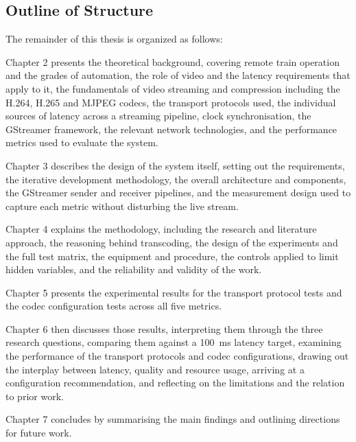 \subsection{Outline of Structure}

The remainder of this thesis is organized as follows:

Chapter 2 presents the theoretical background, covering remote train operation and the grades of automation, the role of video and the latency requirements that apply to it, the fundamentals of video streaming and compression including the H.264, H.265 and MJPEG codecs, the transport protocols used, the individual sources of latency across a streaming pipeline, clock synchronisation, the GStreamer framework, the relevant network technologies, and the performance metrics used to evaluate the system. 

Chapter 3 describes the design of the system itself, setting out the requirements, the iterative development methodology, the overall architecture and components, the GStreamer sender and receiver pipelines, and the measurement design used to capture each metric without disturbing the live stream. 

Chapter 4 explains the methodology, including the research and literature approach, the reasoning behind transcoding, the design of the experiments and the full test matrix, the equipment and procedure, the controls applied to limit hidden variables, and the reliability and validity of the work. 

Chapter 5 presents the experimental results for the transport protocol tests and the codec configuration tests across all five metrics. 

Chapter 6 then discusses those results, interpreting them through the three research questions, comparing them against a 100~ms latency target, examining the performance of the transport protocols and codec configurations, drawing out the interplay between latency, quality and resource usage, arriving at a configuration recommendation, and reflecting on the limitations and the relation to prior work. 

Chapter 7 concludes by summarising the main findings and outlining directions for future work.
